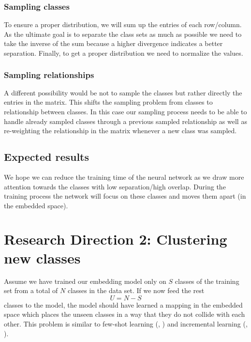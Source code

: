 \subsubsection{Sampling classes}
To ensure a proper distribution, we will sum up the entries of each row/column. As the ultimate goal is to separate the class sets as much as possible we need to take the inverse of the sum because a higher divergence indicates a better separation. Finally, to get a proper distribution we need to normalize the values.

\subsubsection{Sampling relationships}
A different possibility would be not to sample the classes but rather directly the entries in the matrix. This shifts the sampling problem from classes to relationship between classes. In this case our sampling process needs to be able to handle already sampled classes through a previous sampled relationship as well as re-weighting the relationship in the matrix whenever a new class was sampled. 

\subsection{Expected results}
We hope we can reduce the training time of the neural network as we draw more attention towards the classes with low separation/high overlap. During the training process the network will focus on these classes and moves them apart (in the embedded space).

\section{Research Direction 2: Clustering new classes}
Assume we have trained our embedding model only on $S$ classes of the training set from a total of $N$ classes in the data set. If we now feed the rest 
\begin{equation*}
	U = N - S
\end{equation*} 
classes to the model, the model should have learned a mapping in the embedded space which places the unseen classes in a way that they do not collide with each other. This problem is similar to few-shot learning (\cite{edwards2016towards}, \cite{snell2017prototypical}) and incremental learning (\cite{lee2018simple}, \cite{yang2018robust}). 

